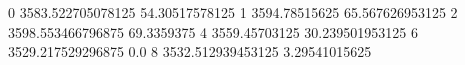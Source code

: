 0 3583.522705078125 54.30517578125
1 3594.78515625 65.567626953125
2 3598.553466796875 69.3359375
4 3559.45703125 30.239501953125
6 3529.217529296875 0.0
8 3532.512939453125 3.29541015625

